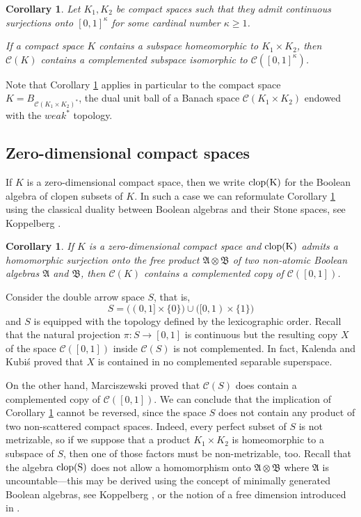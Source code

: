 \documentclass[12pt,fleqn]{amsart}
\numberwithin{equation}{section}
\newtheorem{cor}[thm]{Corollary}
\theoremstyle{definition}
\def\C{\mathcal C}
\begin{document}
\begin{cor}\label{general}
Let $K_1, K_2$ be  compact spaces such that
they admit continuous surjections onto $[0,1]^\kappa$ for some
cardinal number $\kappa\ge 1$.

If a compact space $K$ contains a subspace homeomorphic to $K_1\times K_2$,
then $\C(K)$ contains a complemented subspace isomorphic to $\C([0, 1]^\kappa)$. 
\end{cor}

Note that Corollary \ref{general} applies in particular to the compact space $K=B_{\C(K_1\times K_2)^\ast}$, the dual unit ball of a Banach space $\C(K_1\times K_2)$ endowed with the $weak^\ast$ topology.

\subsection{Zero-dimensional compact spaces}

\newcommand{\clop}{\rm clop}
\newcommand{\fA}{\mathfrak A}
\newcommand{\fB}{\mathfrak B}

If $K$ is a zero-dimensional compact space, then we write $\clop(K)$ for the Boolean algebra of clopen subsets of $K$.
In such a case we can reformulate Corollary \ref{general} using the classical
duality between Boolean algebras and their Stone spaces, see Koppelberg \cite{Ko88}.

\begin{cor}\label{zerodim}
If $K$ is a zero-dimensional compact space and $\clop(K)$
admits a homomorphic surjection onto the free product $\fA\otimes\fB$  of two non-atomic Boolean algebras $\fA$ and $\fB$, then
$\C(K)$ contains a complemented copy of $\C([0,1])$.
\end{cor}

Consider the double arrow space $S$, that  is,
\[ S=\big((0,1]\times\{0\}\big)\cup \big( [0,1)\times \{1\}\big)\]
and $S$ is equipped with the topology defined by the lexicographic order.
Recall that the natural projection $\pi\colon S\to [0,1]$ is continuous but the resulting copy $X$ of 
the space $\C([0,1])$ inside $\C(S)$ is not complemented. In fact, Kalenda and Kubi\'s \cite{KK12} proved that
$X$ is contained in no complemented separable superspace. 

On the other  hand,
Marciszewski \cite{Ma08} proved that $\C(S)$ does contain a complemented copy of $\C([0,1])$.  
We can conclude that the implication of Corollary \ref{zerodim} cannot be reversed,
since the space $S$ does not contain any product of two non-scattered compact spaces. Indeed, every perfect subset of $S$
is not metrizable, so if we suppose that a product $K_1\times K_2$ is homeomorphic to a subspace of $S$,
then one of those factors must be non-metrizable, too. Recall that  the algebra $\clop (S)$ does not allow a homomorphism onto
$\fA\otimes\fB$ where $\fA$ is uncountable---this may be derived
using the concept of minimally generated Boolean algebras, see Koppelberg \cite{Ko88},
or the notion of a free dimension introduced in \cite{MP19}.
\end{document}

